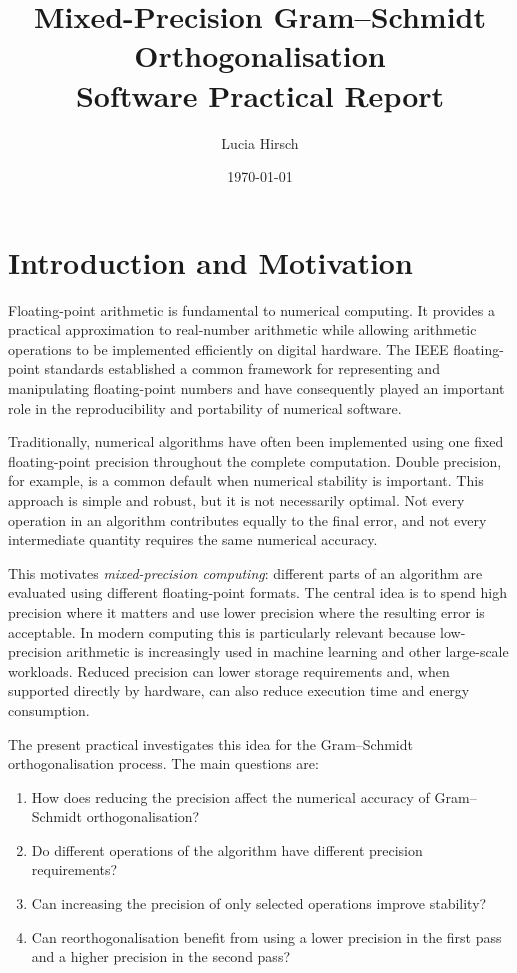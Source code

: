 \documentclass[a4paper,11pt]{article}
\title{\textbf{Mixed-Precision Gram--Schmidt Orthogonalisation}\\[0.4em]
\large Software Practical Report}
\author{Lucia Hirsch}
\date{\today}
\begin{document}
\maketitle

\section{Introduction and Motivation}

Floating-point arithmetic is fundamental to numerical computing. It provides a
practical approximation to real-number arithmetic while allowing arithmetic
operations to be implemented efficiently on digital hardware. The IEEE
floating-point standards established a common framework for representing and
manipulating floating-point numbers and have consequently played an important
role in the reproducibility and portability of numerical software.

Traditionally, numerical algorithms have often been implemented using one
fixed floating-point precision throughout the complete computation. Double
precision, for example, is a common default when numerical stability is
important. This approach is simple and robust, but it is not necessarily
optimal. Not every operation in an algorithm contributes equally to the final
error, and not every intermediate quantity requires the same numerical
accuracy.

This motivates \emph{mixed-precision computing}: different parts of an
algorithm are evaluated using different floating-point formats. The central
idea is to spend high precision where it matters and use lower precision where
the resulting error is acceptable. In modern computing this is particularly
relevant because low-precision arithmetic is increasingly used in machine
learning and other large-scale workloads. Reduced precision can lower storage
requirements and, when supported directly by hardware, can also reduce
execution time and energy consumption.

The present practical investigates this idea for the
Gram--Schmidt orthogonalisation process. The main questions are:

\begin{enumerate}[label=(\roman*)]
    \item How does reducing the precision affect the numerical accuracy of
    Gram--Schmidt orthogonalisation?
    \item Do different operations of the algorithm have different precision
    requirements?
    \item Can increasing the precision of only selected operations improve
    stability?
    \item Can reorthogonalisation benefit from using a lower precision in the
    first pass and a higher precision in the second pass?
\end{enumerate}
\end{document}
